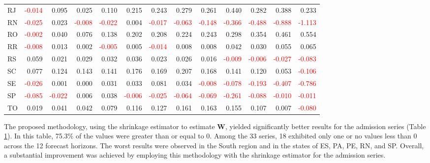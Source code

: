 \documentclass[a4paper,preprint,11pt,authoryear]{elsarticle}
\begin{document}
\begin{table}
{\begin{tabular}{lrrrrrrrrrrrr}
      RJ & \textcolor{red}{-0.014} & 0.095 & 0.025 & 0.110 & 0.215 & 0.243 & 0.279 & 0.261 & 0.440 & 0.282 & 0.388 & 0.233 \\
      RN & \textcolor{red}{-0.025} & 0.023 & \textcolor{red}{-0.008} & \textcolor{red}{-0.022} & 0.004 & \textcolor{red}{-0.017} & \textcolor{red}{-0.063} & \textcolor{red}{-0.148} & \textcolor{red}{-0.366} & \textcolor{red}{-0.488} & \textcolor{red}{-0.888} & \textcolor{red}{-1.113} \\
      RO & \textcolor{red}{-0.002} & 0.040 & 0.076 & 0.138 & 0.202 & 0.208 & 0.224 & 0.243 & 0.298 & 0.354 & 0.461 & 0.554 \\
      RR & \textcolor{red}{-0.008} & 0.013 & 0.002 & \textcolor{red}{-0.005} & 0.005 & \textcolor{red}{-0.014} & 0.008 & 0.008 & 0.042 & 0.030 & 0.055 & 0.065 \\
      RS & 0.059 & 0.021 & 0.029 & 0.032 & 0.036 & 0.023 & 0.026 & 0.016 & \textcolor{red}{-0.009} & \textcolor{red}{-0.006} & \textcolor{red}{-0.027} & \textcolor{red}{-0.083} \\
      SC & 0.077 & 0.124 & 0.143 & 0.141 & 0.176 & 0.169 & 0.207 & 0.168 & 0.141 & 0.120 & 0.053 & \textcolor{red}{-0.106} \\
      SE & \textcolor{red}{-0.026} & 0.001 & 0.000 & 0.031 & 0.033 & 0.081 & 0.034 & \textcolor{red}{-0.008} & \textcolor{red}{-0.078} & \textcolor{red}{-0.193} & \textcolor{red}{-0.407} & \textcolor{red}{-0.786} \\
      SP & \textcolor{red}{-0.085} & \textcolor{red}{-0.022} & 0.006 & 0.038 & \textcolor{red}{-0.006} & \textcolor{red}{-0.025} & \textcolor{red}{-0.064} & \textcolor{red}{-0.069} & \textcolor{red}{-0.261} & \textcolor{red}{-0.088} & \textcolor{red}{-0.010} & \textcolor{red}{-0.011} \\
      TO & 0.019 & 0.041 & 0.042 & 0.079 & 0.116 & 0.127 & 0.161 & 0.163 & 0.155 & 0.107 & 0.007 & \textcolor{red}{-0.080} \\
      \hline
    \end{tabular}%
  }
  \label{tab:adm_sh}
\end{table}

The proposed methodology, using the shrinkage estimator to estimate $\bm{W}$, yielded significantly better results for the admission series (Table \ref{tab:adm_sh}). In this table, 75.3\% of the values were greater than or equal to 0. Among the 33 series, 18 exhibited only one or no values less than 0 across the 12 forecast horizons. The worst results were observed in the South region and in the states of ES, PA, PE, RN, and SP. Overall, a substantial improvement was achieved by employing this methodology with the shrinkage estimator for the admission series.
\end{document}
